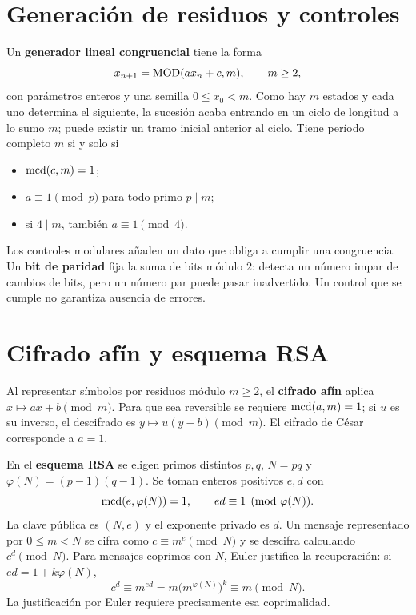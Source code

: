 \section{Generación de residuos y controles}

Un \textbf{generador lineal congruencial} tiene la forma
\[
 x_{n+1}=\operatorname{MOD}(ax_n+c,m),\qquad m\ge2,
\]
con parámetros enteros y una semilla $0\le x_0<m$.
Como hay $m$ estados y cada uno determina el siguiente, la sucesión
acaba entrando en un ciclo de longitud a lo sumo $m$;
puede existir un tramo inicial anterior al ciclo.
Tiene período completo $m$ si y solo si
\begin{itemize}
 \item $\operatorname{mcd}(c,m)=1$;
 \item $a\equiv1\pmod p$ para todo primo $p\mid m$;
 \item si $4\mid m$, también $a\equiv1\pmod4$.
\end{itemize}

Los controles modulares añaden un dato que obliga a cumplir una
congruencia. Un \textbf{bit de paridad} fija la suma de bits módulo $2$:
detecta un número impar de cambios de bits, pero un número par puede
pasar inadvertido. Un control que se cumple no garantiza ausencia de errores.

\section{Cifrado afín y esquema RSA}

Al representar símbolos por residuos módulo $m\ge2$, el
\textbf{cifrado afín} aplica $x\mapsto ax+b\pmod m$.
Para que sea reversible se requiere $\operatorname{mcd}(a,m)=1$; si $u$ es su inverso,
el descifrado es $y\mapsto u(y-b)\pmod m$.
El cifrado de César corresponde a $a=1$.

En el \textbf{esquema RSA} se eligen primos distintos $p,q$,
$N=pq$ y $\varphi(N)=(p-1)(q-1)$.
Se toman enteros positivos $e,d$ con
\[
 \operatorname{mcd}(e,\varphi(N))=1,\qquad ed\equiv1\pmod{\varphi(N)}.
\]
La clave pública es $(N,e)$ y el exponente privado es $d$.
Un mensaje representado por $0\le m<N$ se cifra como
$c\equiv m^e\pmod N$ y se descifra calculando $c^d\pmod N$.
Para mensajes coprimos con $N$, Euler justifica la recuperación:
si $ed=1+k\varphi(N)$,
\[
 c^d\equiv m^{ed}
       =m\bigl(m^{\varphi(N)}\bigr)^k\equiv m\pmod N.
\]
La justificación por Euler requiere precisamente esa coprimalidad.

